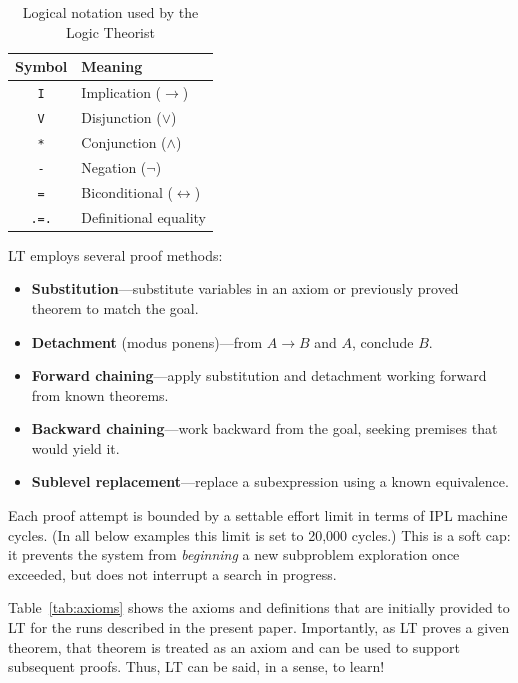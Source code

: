 \documentclass[journal]{IEEEtran}
\begin{document}
\begin{table}[h]
\centering
\caption{Logical notation used by the Logic Theorist}
\label{tab:notation}
\begin{tabular}{cl}
\toprule
\textbf{Symbol} & \textbf{Meaning} \\
\midrule
\texttt{I} & Implication ($\rightarrow$) \\
\texttt{V} & Disjunction ($\lor$) \\
\texttt{*} & Conjunction ($\land$) \\
\texttt{-} & Negation ($\lnot$) \\
\texttt{=} & Biconditional ($\leftrightarrow$) \\
\texttt{.=.} & Definitional equality \\
\bottomrule
\end{tabular}
\end{table}

LT employs several proof methods:

\begin{itemize}
\item \textbf{Substitution}---substitute variables in an axiom or
  previously proved theorem to match the goal.
\item \textbf{Detachment} (modus ponens)---from $A \rightarrow B$ and
  $A$, conclude $B$.
\item \textbf{Forward chaining}---apply substitution and detachment
  working forward from known theorems.
\item \textbf{Backward chaining}---work backward from the goal,
  seeking premises that would yield it.
\item \textbf{Sublevel replacement}---replace a subexpression using a
  known equivalence.
\end{itemize}

Each proof attempt is bounded by a settable effort limit in terms of
IPL machine cycles. (In all below examples this limit is set to 20,000
cycles.) This is a soft cap: it prevents the system from
\textit{beginning} a new subproblem exploration once exceeded, but
does not interrupt a search in progress.

Table~\ref{tab:axioms} shows the axioms and definitions that are
initially provided to LT for the runs described in the present
paper. Importantly, as LT proves a given theorem, that theorem is
treated as an axiom and can be used to support subsequent
proofs. Thus, LT can be said, in a sense, to learn!
\end{document}
